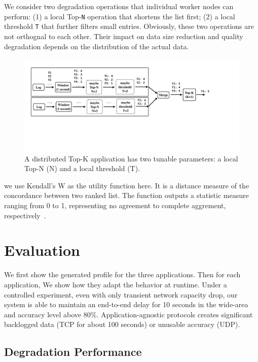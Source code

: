 We consider two degradation operations that individual worker nodes can perform:
(1) a local Top-\texttt{N} operation that shortens the list first; (2) a local
threshold \texttt{T} that further filters small entries. Obviously, these two
operations are not orthognal to each other. Their impact on data size reduction
and quality degradation depends on the distribution of the actual data.

\begin{figure}
  \centering
  \includegraphics[width=\linewidth]{figures/topk.pdf}
  \caption{A distributed Top-K application has two tunable parameters: a local
    Top-N (N) and a local threshold (T).}
  \label{fig:topk}
\end{figure}


we use Kendall's W as the utility function here. It is a distance measure of the
concordance between two ranked list. The function outputs a statistic measure
ranging from 0 to 1, representing no agreement to complete aggrement,
respectively~\cite{abdi2007kendall}.


\section{Evaluation}
\label{sec:evaluation}

We first show the generated profile for the three applications. Then for each
application, We show how they adapt the behavior at runtime. Under a controlled
experiment, even with only transient network capacity drop, our system is able
to maintain an end-to-end delay for 10 seconds in the wide-area and accuracy
level above 80\%. Application-agnostic protocols creates significant backlogged
data (TCP for about 100 seconds) or unusable accuracy (UDP).

\subsection{Degradation Performance}
\label{sec:degr-perf}

